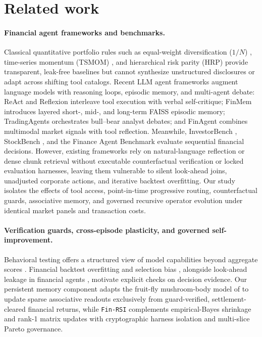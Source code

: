 \documentclass[11pt]{article}
\begin{document}
\section{Related work}
\paragraph{Financial agent frameworks and benchmarks.}
Classical quantitative portfolio rules such as equal-weight diversification ($1/N$)
\cite{demiguel2009optimal}, time-series momentum (TSMOM) \cite{moskowitz2012time}, and
hierarchical risk parity (HRP) \cite{lopez2016building} provide transparent, leak-free
baselines but cannot synthesize unstructured disclosures or adapt across shifting tool
catalogs. Recent LLM agent frameworks augment language models with reasoning loops,
episodic memory, and multi-agent debate: ReAct \cite{yao2023react} and Reflexion
\cite{shinn2023reflexion} interleave tool execution with verbal self-critique; FinMem
\cite{yu2024finmem} introduces layered short-, mid-, and long-term FAISS episodic memory;
TradingAgents \cite{xiao2024tradingagents} orchestrates bull--bear analyst debates; and
FinAgent \cite{zhang2024finagent} combines multimodal market signals with tool reflection.
Meanwhile, InvestorBench \cite{kou2024investorbench}, StockBench \cite{chen2025stockbench},
and the Finance Agent Benchmark \cite{bigeard2025finance} evaluate sequential financial
decisions. However, existing frameworks rely on natural-language reflection or dense chunk
retrieval without executable counterfactual verification or locked evaluation harnesses,
leaving them vulnerable to silent look-ahead joins, unadjusted corporate actions, and
iterative backtest overfitting. Our study isolates the effects of tool access, point-in-time
progressive routing, counterfactual guards, associative memory, and governed recursive
operator evolution under identical market panels and transaction costs.

\paragraph{Verification guards, cross-episode plasticity, and governed self-improvement.}
Behavioral testing offers a structured view of model capabilities beyond aggregate
scores \cite{ribeiro2020checklist}. Financial backtest overfitting and selection bias
\cite{bailey2014deflated,bailey2017pbo}, alongside look-ahead leakage in financial agents
\cite{li2025profit}, motivate explicit checks on decision evidence. Our persistent memory
component adapts the fruit-fly mushroom-body model of \citet{huang2024memory} to update
sparse associative readouts exclusively from guard-verified, settlement-cleared financial
returns, while \texttt{Fin-RSI} complements empirical-Bayes shrinkage \cite{james1961estimation,ledoit2004honey}
and rank-1 matrix updates \cite{sherman1950adjustment} with cryptographic harness isolation
and multi-slice Pareto governance.
\end{document}
